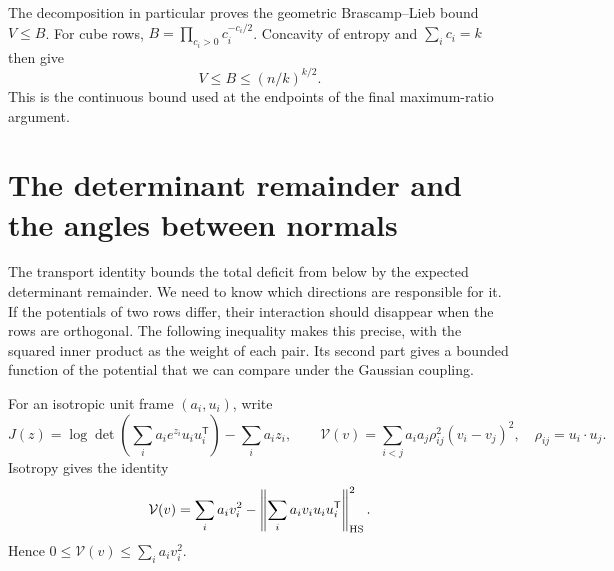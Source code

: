 \documentclass[11pt,a4paper]{article}
\theoremstyle{remark}\newtheorem{remark}[theorem]{Remark}
\numberwithin{equation}{section}
\begin{document}
The decomposition in particular proves the geometric Brascamp--Lieb
bound $V\le B$. For cube rows, $B=\prod_{c_i>0}c_i^{-c_i/2}$.
Concavity of entropy and $\sum_i c_i=k$ then give
\[
 V\le B\le(n/k)^{k/2}.
\]
This is the continuous bound used at the endpoints of the final
maximum-ratio argument.

\section{The determinant remainder and the angles between normals}
\label{sec:exponential-determinant-coercivity}

The transport identity bounds the total deficit from below by the
expected determinant remainder. We need to know which directions are
responsible for it. If the potentials of two rows differ, their
interaction should disappear when the rows are orthogonal. The
following inequality makes this precise, with the squared inner product
as the weight of each pair. Its second part gives a bounded function
of the potential that we can compare under the Gaussian coupling.

For an isotropic unit frame $(a_i,u_i)$, write
\[
 J(z)=\log\det\left(\sum_i a_i e^{z_i}u_i u_i^{\mathsf T}\right)
                      -\sum_i a_i z_i,
 \qquad
 \mathcal V(v)=\sum_{i<j}a_i a_j\rho_{ij}^2(v_i-v_j)^2,
 \quad \rho_{ij}=u_i\cdot u_j.
\]
Isotropy gives the identity
\[
 \mathcal V(v)=\sum_i a_i v_i^2-
 \left\|\sum_i a_i v_i u_i u_i^{\mathsf T}\right\|_{\rm HS}^2.
\]
Hence $0\le\mathcal V(v)\le\sum_i a_i v_i^2$.
\end{document}
